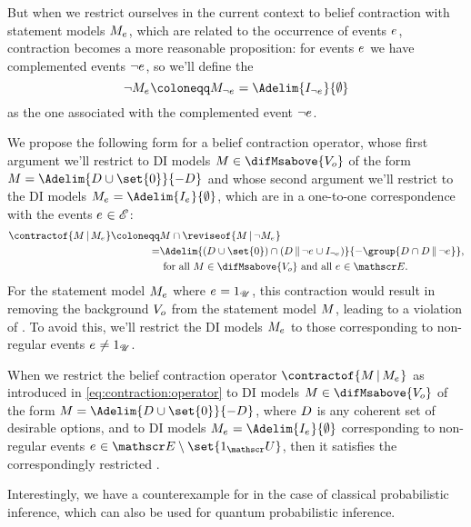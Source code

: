 \documentclass[preprint]{isipta2025}
\begin{document}
But when we restrict ourselves in the current context to belief contraction with statement models \(M_{e_{}}\), which are related to the occurrence of events \(e_{}\), contraction becomes a more reasonable proposition: for events \(e_{}\) we have complemented events \(\neg e_{}\), so we'll define the 
\begin{equation}\label{eq:negation}
\neg\eventM
\coloneqq\eventM[\neg\eventopt]
=\Adelim{\indifset[\neg\eventopt]}{\emptyset}
\end{equation}
as the one associated with the complemented event \(\neg e_{}\).

We propose the following form for a belief contraction operator, whose first argument we'll restrict to DI models \(\M\in\difMsabove{\zeroM}\) of the form \(\M=\Adelim{\desirset\cup\set{0}}{-\desirset}\) and whose second argument we'll restrict to the DI models \(\eventM=\Adelim{\eventindifset}{\emptyset}\), which are in a one-to-one correspondence with the events \(e_{}\in\mathscr{E}\):
\begin{align}
\contractof{\M\given\eventM}
\coloneqq&\M\intersection\reviseof{\M\given\neg\eventM}
\label{eq:contraction:operator}\\
=&\Adelim{(\desirset\cup\set{0})\cap(\desirset\altcondon\neg\eventopt\cup\indifset[\neg\eventopt])}{-\group{\desirset\cap\desirset\altcondon\neg\eventopt}},\notag\\
&\text{ for all \(\M\in\difMsabove{\zeroM}\) and all \(\eventopt\in\eventopts\)}.\notag
\end{align}
For the statement model \(M_{e_{}}\) where \(e_{}=1_{\mathscr{U}}\), this contraction would result in removing the background \({V_o}\) from the statement model \(M\), leading to a violation of .
To avoid this, we'll restrict the DI models \(M_{e_{}}\) to those corresponding to non-regular events \(e_{}\neq1_{\mathscr{U}}\).

\begin{proposition}\label{prop:contraction}
When we restrict the belief contraction operator \(\contractof{\M\given\eventM}\) as introduced in \cref{eq:contraction:operator} to DI models \(\M\in\difMsabove{\zeroM}\) of the form \(\M=\Adelim{\desirset\cup\set{0}}{-\desirset}\), where \(D_{}\) is any coherent set of desirable options, and to DI models \(\eventM=\Adelim{\eventindifset}{\emptyset}\) corresponding to non-regular events \(\eventopt\in\eventopts\setminus\set{\uniteventopt}\), then it satisfies the correspondingly restricted .
\end{proposition}
\noindent Interestingly, we have a counterexample for  in the case of classical probabilistic inference, which can also be used for quantum probabilistic inference.
\end{document}
